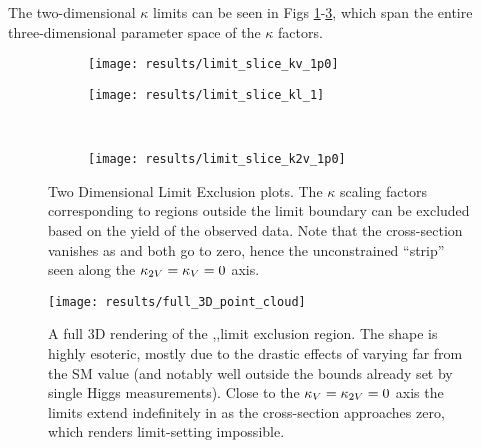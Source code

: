     The two-dimensional $\kappa$ limits can be seen in Figs \ref{fig:limit_slice_kv_1p0}-\ref{fig:limit_slice_k2v_1p0},
        which span the entire three-dimensional parameter space of the $\kappa$ factors.

    \begin{figure}
        \centering
        \begin{subfigure}{0.48\textwidth} 
            \texttt{[image: results/limit\_slice\_kv\_1p0]}
            \caption{}%
            \label{fig:limit_slice_kv_1p0}
        \end{subfigure}
        \begin{subfigure}{0.48\textwidth}
            \texttt{[image: results/limit\_slice\_kl\_1]}
            \caption{}%
            \label{fig:limit_slice_kl_1p0}
        \end{subfigure}\\
        \begin{subfigure}{0.48\textwidth} 
            \texttt{[image: results/limit\_slice\_k2v\_1p0]}
            \caption{}%
            \label{fig:limit_slice_k2v_1p0}
        \end{subfigure}
        \caption{
            Two Dimensional Limit Exclusion plots.
            The $\kappa$ scaling factors corresponding to regions outside the limit boundary
                can be excluded based on the yield of the observed data.
            Note that the \vbfproc cross-section vanishes as \kvv and \kv both go to zero,
                hence the unconstrained ``strip'' seen along the $\kappa_{2V} = \kappa_{V} = 0$ axis.
        }
        \label{fig:limit_slices}
    \end{figure}

    \begin{figure}
        \centering
        \texttt{[image: results/full\_3D\_point\_cloud]}
        \label{fig:full_3D_point_cloud}
        \caption{
            A full 3D rendering of the \kvv,\kl,\kv limit exclusion region.
            The shape is highly esoteric, mostly due to the drastic effects of varying \kv far from the SM value
                (and notably well outside the bounds already set by single Higgs measurements).
            Close to the $\kappa_{V} = \kappa_{2V} = 0$ axis the limits extend indefinitely in \kl
                as the cross-section approaches zero,
                which renders limit-setting impossible.
        }
    \end{figure}

